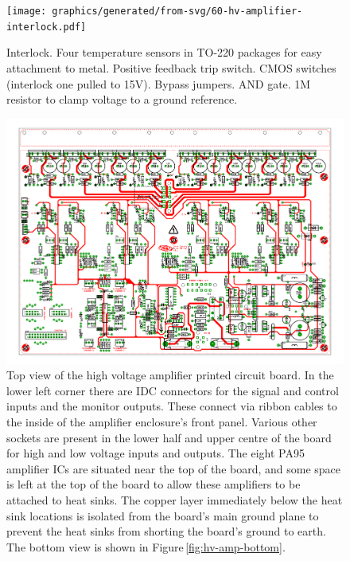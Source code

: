 \begin{figure}
  \centering
  \texttt{[image: graphics/generated/from-svg/60-hv-amplifier-interlock.pdf]}
  \caption[High voltage amplifier interlock schematic]{\label{fig:hv-amp-interlock}Interlock. Four temperature sensors in TO-220 packages for easy attachment to metal. Positive feedback trip switch. CMOS switches (interlock one pulled to 15V). Bypass jumpers. AND gate. 1M resistor to clamp voltage to a ground reference.}
\end{figure}

\begin{figure}
  \centering
  \includegraphics[width=\columnwidth]{graphics/60-hv-amp-top.pdf}
  \caption[High voltage amplifier board layout (top)]{\label{fig:hv-amp-top}Top view of the high voltage amplifier printed circuit board. In the lower left corner there are IDC connectors for the signal and control inputs and the monitor outputs. These connect via ribbon cables to the inside of the amplifier enclosure's front panel. Various other sockets are present in the lower half and upper centre of the board for high and low voltage inputs and outputs. The eight PA95 amplifier ICs are situated near the top of the board, and some space is left at the top of the board to allow these amplifiers to be attached to heat sinks. The copper layer immediately below the heat sink locations is isolated from the board's main ground plane to prevent the heat sinks from shorting the board's ground to earth. The bottom view is shown in Figure\,\ref{fig:hv-amp-bottom}.}
\end{figure}

